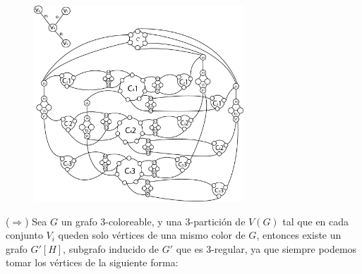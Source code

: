 \documentclass{article}
\begin{document}
\begin{figure}[!h]
    \centering
    \includegraphics[width= 0.7\textwidth ]{img7.png}
\end{figure}
($\Rightarrow$) Sea $G$ un grafo $3$-coloreable, y una $3$-partici\'on de $V(G)$ tal que en cada conjunto $V_i$ queden solo v\'ertices de una mismo 
color de $G$, entonces existe un grafo $G'[H]$, subgrafo inducido de $G'$ que es $3$-regular, ya que siempre podemos tomar los v\'ertices de la siguiente forma:\\
\end{document}

